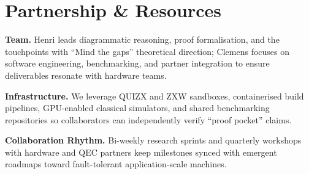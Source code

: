 \section{Partnership \& Resources}
\textbf{Team.} Henri leads diagrammatic reasoning, proof formalisation, and the touchpoints with ``Mind the gaps'' theoretical direction; Clemens focuses on software engineering, benchmarking, and partner integration to ensure deliverables resonate with hardware teams.

\textbf{Infrastructure.} We leverage QUIZX and ZXW sandboxes, containerised build pipelines, GPU-enabled classical simulators, and shared benchmarking repositories so collaborators can independently verify ``proof pocket'' claims.

\textbf{Collaboration Rhythm.} Bi-weekly research sprints and quarterly workshops with hardware and QEC partners keep milestones synced with emergent roadmaps toward fault-tolerant application-scale machines.
